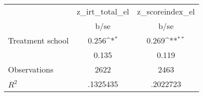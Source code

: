 {
\def\sym#1{\ifmmode^{#1}\else\(^{#1}\)\fi}
\begin{tabular}{l*{2}{c}}
\toprule
                    &z\_irt\_total\_el         &z\_scoreindex\_el         \\
                    &        b/se         &        b/se         \\
\midrule
Treatment school    &       0.256\sym{*}  &       0.269\sym{**} \\
                    &       0.135         &       0.119         \\
\midrule
Observations        &        2622         &        2463         \\
\(R^{2}\)           &    .1325435         &    .2022723         \\
\bottomrule
\end{tabular}
}
